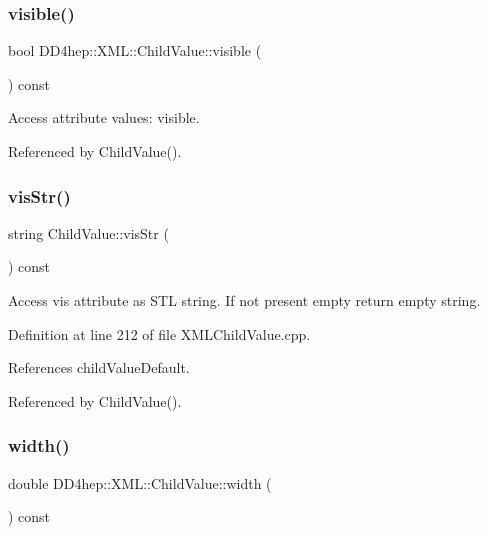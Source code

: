 \subsubsection{\texorpdfstring{visible()}{visible()}}
{\footnotesize\ttfamily bool D\+D4hep\+::\+X\+M\+L\+::\+Child\+Value\+::visible (\begin{DoxyParamCaption}{ }\end{DoxyParamCaption}) const}



Access attribute values\+: visible. 



Referenced by Child\+Value().

\hypertarget{struct_d_d4hep_1_1_x_m_l_1_1_child_value_ad3ddf5f5c701b7a14f35571c2283c79b}{}\label{struct_d_d4hep_1_1_x_m_l_1_1_child_value_ad3ddf5f5c701b7a14f35571c2283c79b} 
\subsubsection{\texorpdfstring{vis\+Str()}{visStr()}}
{\footnotesize\ttfamily string Child\+Value\+::vis\+Str (\begin{DoxyParamCaption}{ }\end{DoxyParamCaption}) const}



Access vis attribute as S\+TL string. If not present empty return empty string. 



Definition at line 212 of file X\+M\+L\+Child\+Value.\+cpp.



References child\+Value\+Default.



Referenced by Child\+Value().

\hypertarget{struct_d_d4hep_1_1_x_m_l_1_1_child_value_a7db2e09a32bef20445f2267314bb8c08}{}\label{struct_d_d4hep_1_1_x_m_l_1_1_child_value_a7db2e09a32bef20445f2267314bb8c08} 
\subsubsection{\texorpdfstring{width()}{width()}}
{\footnotesize\ttfamily double D\+D4hep\+::\+X\+M\+L\+::\+Child\+Value\+::width (\begin{DoxyParamCaption}{ }\end{DoxyParamCaption}) const}




